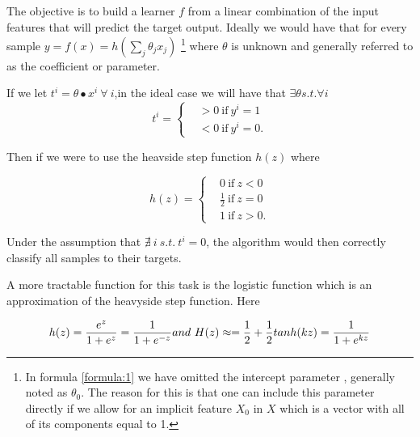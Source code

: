 The objective is to build a learner $f$ from a linear combination of the input features that will predict the target output. Ideally we would have that for every sample $y = f(x) = h\left(\sum_{j}\theta_jx_j\right)$ \label{formula:1} \footnote{In formula \ref{formula:1} we have omitted the intercept parameter , generally noted as $\theta_0$. The reason for this is that one can include this parameter directly if we allow for an implicit feature $X_0$ in $X$ which is a vector with all of its components equal to 1.  } where $\theta$ is unknown and generally referred to as the coefficient or parameter. 

If we let $ t^i = \theta \bullet x^i  \ \forall \ i $,in the ideal case we will have that $\exists \theta s.t. \forall i $ 
\[
    t^i =
      \begin{cases}
        &>0 \ \mbox{if} \ y^i=1 \\
        &<0 \ \mbox{if} \ y^i=0.
      \end{cases}
    \]

Then if we were to use the heavside step function $h(z)$  where

\[
    h(z) =
      \begin{cases}
        &0 \ \mbox{if} \ z<0 \\
        &\frac{1}{2} \ \mbox{if} \  z=0 \\
        &1 \ \mbox{if} \  z>0.
      \end{cases}
    \]

Under the assumption that $\nexists\  i \  s.t. \ t^i = 0$, the algorithm would then correctly classify all samples to their targets. 


A more tractable function for this task is the logistic function which is an approximation of the heavyside step function. Here  

\begin{equation} \label{eq:logit}
h(z)  = \frac{e^{z}}{1 + e^{z}} = \frac{1}{1 + e^{-z}}  \\

and \  H(z) \approx = \frac{1}{2} + \frac{1}{2}tanh(kz) = \frac{1}{1+e^{kz}}  


\end{equation}


